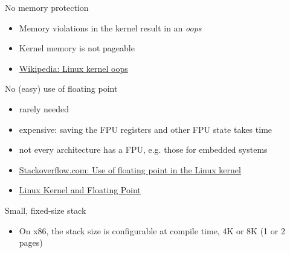 \begin{frame}
  \begin{block}{No memory protection}
    \begin{itemize}
    \item Memory violations in the kernel result in an \emph{oops}
    \item Kernel memory is not pageable
    \end{itemize}
  \end{block}
\end{frame}

\begin{itemize}
\item \href{http://en.wikipedia.org/wiki/Linux_kernel_oops}{Wikipedia: Linux kernel oops}
\end{itemize}

\begin{frame}
  \begin{block}{No (easy) use of floating point}
    \begin{itemize}
    \item rarely needed
    \item expensive: saving the FPU registers and other FPU state takes time
    \item not every architecture has a FPU, e.g. those for embedded systems
    \end{itemize}
  \end{block}
\end{frame}

\begin{itemize}
\item \href{http://stackoverflow.com/questions/13886338/use-of-floating-point-in-the-linux-kernel}{Stackoverflow.com:
  Use of floating point in the Linux kernel}
\item \href{http://porterchen-note.blogspot.com/2011/03/linux-kernel-and-floating-point.html}{Linux Kernel and Floating Point}
\end{itemize}

\begin{frame}
  \begin{block}{Small, fixed-size stack}
    \begin{itemize}
    \item On x86, the stack size is configurable at compile time, 4K or 8K (1 or 2 pages)
    \end{itemize}
  \end{block}
\end{frame}

